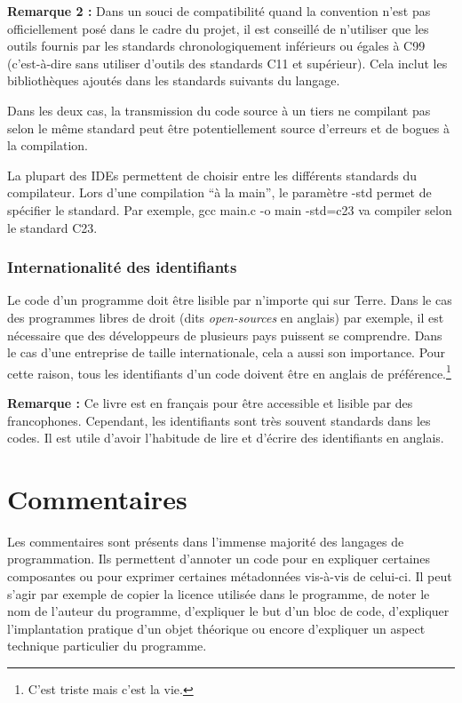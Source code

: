 \documentclass[../../../main.tex]{subfiles}
\begin{document}
\textbf{Remarque 2 :} Dans un souci de compatibilité quand la convention n'est pas officiellement posé dans le cadre du projet, il est conseillé de n'utiliser que les outils fournis par les standards chronologiquement inférieurs ou égales à C99 (c'est-à-dire sans utiliser d'outils des standards C11 et supérieur). Cela inclut les bibliothèques ajoutés dans les standards suivants du langage.
 
Dans les deux cas, la transmission du code source à un tiers ne compilant pas selon le même standard peut être potentiellement source d'erreurs et de bogues à la compilation.
 
La plupart des IDEs permettent de choisir entre les différents standards du compilateur. Lors d'une compilation ``à la main'', le paramètre \textsf{-std} permet de spécifier le standard. Par exemple, \textsf{gcc main.c -o main -std=c23} va compiler selon le standard C23.
 
\subsubsection{Internationalité des identifiants}
 
Le code d'un programme doit être lisible par n'importe qui sur Terre. Dans le cas des programmes libres de droit (dits \textit{open-sources} en anglais) par exemple, il est nécessaire que des développeurs de plusieurs pays puissent se comprendre. Dans le cas d'une entreprise de taille internationale, cela a aussi son importance. Pour cette raison, tous les identifiants d'un code doivent être en anglais de préférence.\footnote{C'est triste mais c'est la vie.}

\textbf{Remarque :} Ce livre est en français pour être accessible et lisible par des francophones. Cependant, les identifiants sont très souvent standards dans les codes. Il est utile d'avoir l'habitude de lire et d'écrire des identifiants en anglais.
\section{Commentaires}
Les commentaires sont présents dans l'immense majorité des langages de programmation. Ils permettent d'annoter un code pour en expliquer certaines composantes ou pour exprimer certaines métadonnées vis-à-vis de celui-ci. Il peut s'agir par exemple de copier la licence utilisée dans le programme, de noter le nom de l'auteur du programme, d'expliquer le but d'un bloc de code, d'expliquer l'implantation pratique d'un objet théorique ou encore d'expliquer un aspect technique particulier du programme.
 
\end{document}
